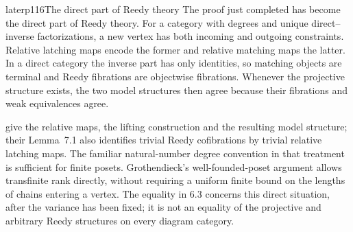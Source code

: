 \begin{dcomment}{later}{p116}{The direct part of Reedy theory}
The proof just completed has become the direct part of Reedy theory. For a category with degrees and unique direct--inverse factorizations, a new vertex has both incoming and outgoing constraints. Relative latching maps encode the former and relative matching maps the latter. In a direct category the inverse part has only identities, so matching objects are terminal and Reedy fibrations are objectwise fibrations. Whenever the projective structure exists, the two model structures then agree because their fibrations and weak equivalences agree.

\citet[Definition~4.14, Observation~4.16 and Theorem~4.18]{RiehlVerity2014Reedy} give the relative maps, the lifting construction and the resulting model structure; their Lemma~7.1 also identifies trivial Reedy cofibrations by trivial relative latching maps. The familiar natural-number degree convention in that treatment is sufficient for finite posets. Grothendieck's well-founded-poset argument allows transfinite rank directly, without requiring a uniform finite bound on the lengths of chains entering a vertex. The equality in 6.3 concerns this direct situation, after the variance has been fixed; it is not an equality of the projective and arbitrary Reedy structures on every diagram category.
\end{dcomment}

